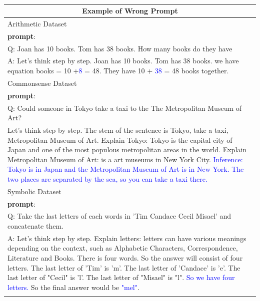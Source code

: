 \documentclass[11pt]{article}
\begin{document}
\begin{table}[th]

\caption{}
\small
  
\begin{tabularx}{\textwidth}{X}
  \label{tabel2}
    \\\toprule
    \multicolumn{1}{c}{\textbf{Example of Wrong Prompt}} \\\midrule
    Arithmetic Dataset\\\midrule

\textbf{prompt}: \\
Q: Joan has 10 books. Tom has 38 books.  How many books do they have\\
A: Let's think step by step. Joan has 10 books. Tom has 38 books. we have equation books = 10 +\textcolor{blue}{8} = 48. They have 10 + \textcolor{blue}{38} = 48 books together.\\\midrule
Commonsense Dataset\\\midrule
\textbf{prompt}: \\
Q: Could someone in Tokyo take a taxi to the The Metropolitan Museum of Art?\\
Let's think step by step. The stem of the sentence is Tokyo, take a taxi, Metropolitan Museum of Art. Explain Tokyo: Tokyo is the capital city of Japan and one of the most populous metropolitan areas in the world. Explain Metropolitan Museum of Art: is a art museums in New York City. \textcolor{blue}{Inference: Tokyo is in Japan and the Metropolitan Museum of Art is in New York. The two places are separated by the sea, so you can take a taxi there.}\\\midrule
Symbolic Dataset\\\midrule
\textbf{prompt}: \\
Q: Take the last letters of each words in  'Tim Candace Cecil Misael' and concatenate them.\\
A: Let's think step by step. Explain letters: letters can have various meanings depending on the context, such as Alphabetic Characters, Correspondence, Literature and Books. There is four words. So the answer will consist of four letters. The last letter of 'Tim' is 'm'. The last letter of 'Candace' is 'e'. The last letter of "Cecil" is 'l'. The last letter of "Misael" is "l". \textcolor{blue}{So we have four letters.} So the final answer would be \textcolor{blue}{"mel"}.\\\bottomrule
    \label{table2}

\end{tabularx}

%

\end{table}
\end{document}
